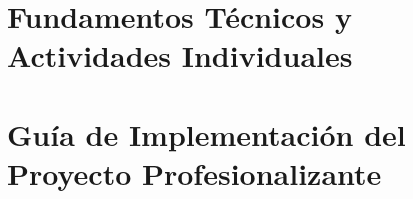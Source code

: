 \documentclass[a4paper,12pt]{book}
\begin{document}




\part{Fundamentos Técnicos y Actividades Individuales}















\setcounter{chapter}{0}

\part{Guía de Implementación del Proyecto Profesionalizante}

















\end{document}

